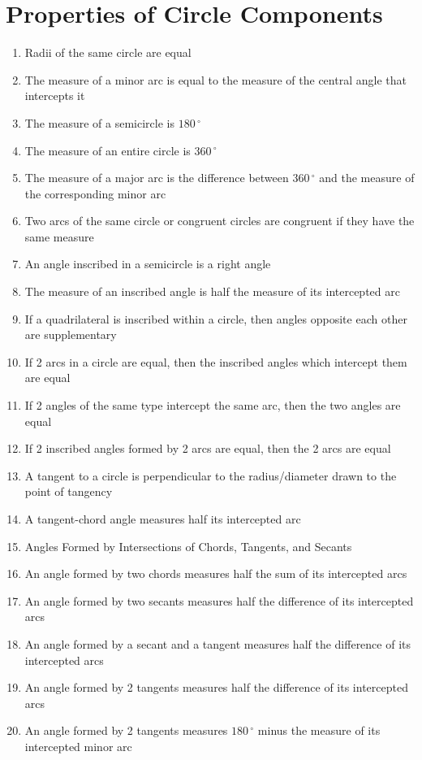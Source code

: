 \documentclass[11pt,letterpaper]{report}
\begin{document}
\section*{Properties of Circle Components}
\begin{enumerate}
    \item Radii of the same circle are equal
    \item The measure of a minor arc is equal to the measure of the central angle that intercepts it
    \item The measure of a semicircle is $180\,^{\circ}$
    \item The measure of an entire circle is $360\,^{\circ}$
    \item The measure of a major arc is the difference between  $360\,^{\circ}$ and the measure of the corresponding minor arc
    \item Two arcs of the same circle or congruent circles are congruent if they have the same measure
    \item An angle inscribed in a semicircle is a right angle
    \item The measure of an inscribed angle is half the measure of its intercepted arc
    \item If a quadrilateral is inscribed within a circle, then angles opposite each other are supplementary
    \item If 2 arcs in a circle are equal, then the inscribed angles which intercept them are equal
    \item If 2 angles of the same type intercept the same arc, then the two angles are equal
    \item If 2 inscribed angles formed by 2 arcs are equal, then the 2 arcs are equal
    \item A tangent to a circle is perpendicular to the radius/diameter drawn to the point of tangency
    \item A tangent-chord angle measures half its intercepted arc
    \item Angles Formed by Intersections of Chords, Tangents, and Secants
    \item An angle formed by two chords measures half the sum of its intercepted arcs
    \item An angle formed by two secants measures half the difference of its intercepted arcs
    \item An angle formed by a secant and a tangent measures half the difference of its intercepted arcs
    \item An angle formed by 2 tangents measures half the difference of its intercepted arcs
    \item An angle formed by 2 tangents measures $180\,^{\circ}$ minus the measure of its intercepted minor arc
\end{enumerate}
\end{document}
